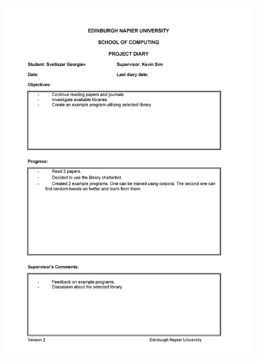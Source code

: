 \documentclass[12pt,a4paper]{article}
\begin{document}
\begin{appendices}
\includegraphics[width=\textwidth,height=\textheight,keepaspectratio]{diary3.png} 
\newpage

\end{appendices}
\end{document}
